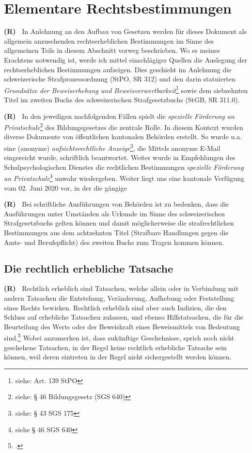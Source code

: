 \documentclass[paper=a4,fontsize=12pt, oneside, numbers=noenddot]{scrbook}
\newcounter{rz}
\newcommand{\Rz}{
	\addtocounter{rz}{1}\textbf{(R\arabic{rz})~}
}
\begin{document}
\section{Elementare Rechtsbestimmungen}
\Rz In Anlehnung an den Aufbau von Gesetzen werden für dieses Dokument als allgemein anzusehenden rechtserheblichen Bestimmungen im Sinne des allgemeinen Teils in diesem Abschnitt vorweg beschrieben. Wo es meines Erachtens notwendig ist, werde ich mittel einschlägiger Quellen die Auslegung der rechtserheblichen Bestimmungen aufzeigen. Dies geschieht im Anlehnung die schweizerische Strafprozessordnung (StPO, SR 312) und den darin statuierten \textit{Grundsätze der Beweiserhebung und Beweisverwertbarkeit}\footnote{siehe: Art. 139 StPO} sowie dem siebzehnten Titel im zweiten Buchs des schweizerischen Strafgesetzbuchs (StGB, SR 311.0).



\Rz In den jeweiligen nachfolgenden Fällen spielt die \textit{spezielle Förderung an Privatschule}\footnote{siehe: § 46 Bildungsgesetz (SGS 640)}  des Bildungsgesetzes die zentrale Rolle. In diesem Kontext wurden diverse Dokumente von öffentlichen kantonalen Behörden erstellt. So wurde u.a. eine (anonyme) \textit{aufsichtsrechtliche Anzeige}\footnote{siehe: § 43 SGS 175}, die Mittels anonyme E-Mail eingereicht wurde, schriftlich beantwortet. Weiter wurde in Empfehlungen des Schulpsychologischen Dienstes die rechtlichen Bestimmungen \textit{spezielle Förderung an Privatschule}\footnote{siehe § 46 SGS 640} unwahr wiedergeben. Weiter liegt uns eine kantonale Verfügung vom 02. Juni 2020 vor, in der die gängige 

\Rz Bei schriftliche Ausführungen von Behörden ist zu bedenken, dass die Ausführungen unter Umständen als Urkunde im Sinne des schweizerischen Strafgesetzbuchs gelten können und damit möglicherweise die strafrechtlichen Bestimmungen aus dem  achtzehnten Titel (Strafbare Handlungen gegen die Amts- und Berufspflicht) des zweiten Buchs zum Tragen kommen können.

\subsection{Die rechtlich erhebliche Tatsache}\label{Recht:Tatsache}
\Rz Rechtlich erheblich sind Tatsachen, welche allein oder in Verbindung mit andern Tatsachen die Entstehung, Veränderung, Aufhebung oder Feststellung eines Rechts bewirken. Rechtlich erheblich sind aber auch Indizien, die den Schluss auf erhebliche Tatsachen zulassen, und ebenso Hilfstatsachen, die für die Beurteilung des Werts oder der Beweiskraft eines Beweismittels von Bedeutung sind.\footcite[E. 3a]{BGE113IV77} Wobei anzumerken ist, dass zukünftige Geschehnisse, sprich noch nicht geschehene Tatsachen, in der Regel keine rechtlich erhebliche Tatsache sein können, weil deren eintreten in der Regel nicht sichergestellt werden können. 
\end{document}
